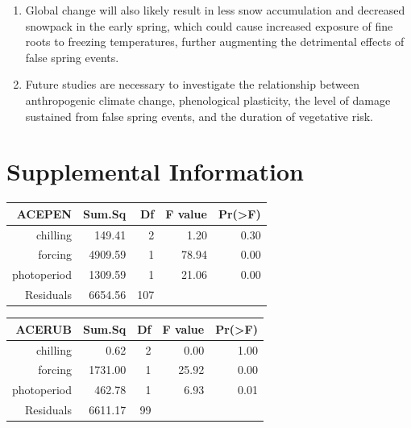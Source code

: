 \documentclass{article}\usepackage[]{graphicx}\usepackage[]{color}
\begin{document}
\begin{enumerate}
\item Global change will also likely result in less snow accumulation and decreased snowpack in the early spring, which could cause increased exposure of fine roots to freezing temperatures, further augmenting the detrimental effects of false spring events. 
\item Future studies are necessary to investigate the relationship between anthropogenic climate change, phenological plasticity, the level of damage sustained from false spring events, and the duration of vegetative risk. 
\end{enumerate}







\section*{Supplemental Information}
\begin{table}[ht]
\centering
\begin{tabular}{rrrrr}
  \hline
  ACEPEN & Sum.Sq & Df & F value & Pr(>F) \\
 \hline
chilling & 149.41 &   2 & 1.20 & 0.30 \\ 
  forcing & 4909.59 &   1 & 78.94 & 0.00 \\ 
  photoperiod & 1309.59 &   1 & 21.06 & 0.00 \\ 
  Residuals & 6654.56 & 107 &  &  \\ 
   \hline
\end{tabular}
\end{table}
\begin{table}[ht]
\centering
\begin{tabular}{rrrrr}
  \hline
  ACERUB & Sum.Sq & Df & F value & Pr(>F) \\
 \hline
chilling & 0.62 &   2 & 0.00 & 1.00 \\ 
  forcing & 1731.00 &   1 & 25.92 & 0.00 \\ 
  photoperiod & 462.78 &   1 & 6.93 & 0.01 \\ 
  Residuals & 6611.17 &  99 &  &  \\ 
   \hline
\end{tabular}
\end{table}
\end{document}
